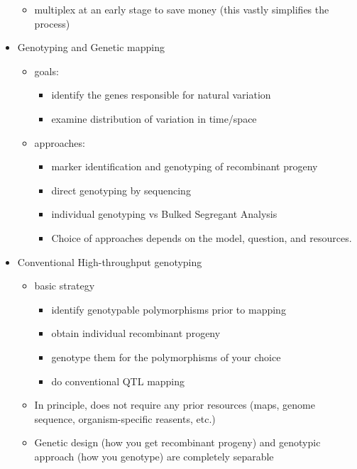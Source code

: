 \documentclass{article}
\begin{document}
\begin{itemize}
\begin{itemize}
            \item multiplex at an early stage to save money (this vastly simplifies the process)
        \end{itemize}
        \item Genotyping and Genetic mapping
        \begin{itemize}
            \item goals:
            \begin{itemize}
                \item identify the genes responsible for natural variation
                \item examine distribution of variation in time/space
            \end{itemize}
            \item approaches:
            \begin{itemize}
                \item marker identification and genotyping of recombinant progeny
                \item direct genotyping by sequencing
                \item individual genotyping vs Bulked Segregant Analysis
                \item Choice of approaches depends on the model, question, and resources.
            \end{itemize}
        \end{itemize}
        \item Conventional High-throughput genotyping
        \begin{itemize}
            \item basic strategy
            \begin{itemize}
                \item identify genotypable polymorphisms prior to mapping
                \item obtain individual recombinant progeny
                \item genotype them for the polymorphisms of your choice
                \item do conventional QTL mapping
            \end{itemize}
            \item In principle, does not require any prior resources (maps, genome sequence, organism-specific reasents, etc.)
            \item Genetic design (how you get recombinant progeny) and genotypic approach (how you genotype) are completely separable

\end{itemize}
\end{itemize}
\end{document}
